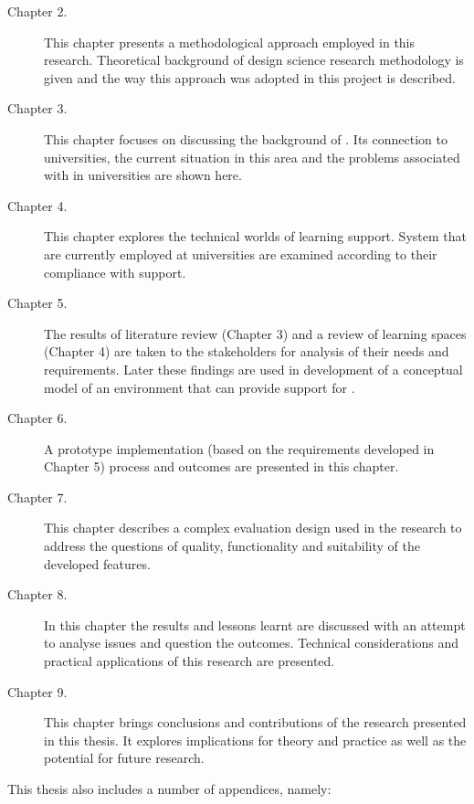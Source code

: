 \begin{description}
\item[Chapter 2.] This chapter presents a methodological approach employed in
this research. Theoretical background of design science research methodology is
given and the way this approach was adopted in this project is described.
\item[Chapter 3.] This chapter focuses on discussing the background of
\LLLsn. Its connection to universities, the current situation in this area and
the problems associated with \LLLs in universities are shown here.
\item[Chapter 4.] This chapter explores the technical worlds of learning
support. System that are currently employed at universities are examined according
to their compliance with \LLLs support.
\item[Chapter 5.] The results of literature review (Chapter 3) and a review of
learning spaces (Chapter 4) are taken to the stakeholders for analysis of their
needs and requirements. Later these findings are used in development of a
conceptual model of an environment that can provide support for \LLLsn.
\item[Chapter 6.] A prototype implementation (based on the requirements
developed in Chapter 5) process and outcomes are presented in this chapter.
\item[Chapter 7.] This chapter describes a complex evaluation design used in the
research to address the questions of quality, functionality and suitability of
the developed features.
\item[Chapter 8.] In this chapter the results and lessons learnt are discussed
with an attempt to analyse issues and question the outcomes. Technical
considerations and practical applications of this research are presented.
\item[Chapter 9.] This chapter brings conclusions and contributions of the
research presented in this thesis. It explores implications for theory and
practice as well as the potential for future research.
\end{description}

This thesis also includes a number of appendices, namely:

